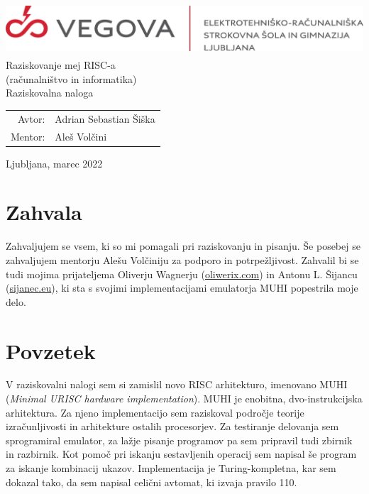 \documentclass[12pt]{article}
\begin{document}
\linespread{1.25}
\begin{titlepage}
  \begin{center}
    \includegraphics[height=2cm]{slike/vegova.png}\\
    \Huge
    \vspace*{6cm}
    Raziskovanje mej RISC-a\\
    \Large
    (računalništvo in informatika)\\
    Raziskovalna naloga\\
  \end{center}
  \vspace{8cm}
  \begin{tabular}{rl}
    Avtor: & Adrian Sebastian Šiška\\
    Mentor: & Aleš Volčini
  \end{tabular}
  \vspace{1cm}
  \begin{center}
    Ljubljana, marec 2022
  \end{center}
\end{titlepage}

\pagebreak
{}

\tableofcontents

\pagebreak

\listoffigures

\pagebreak

\section{Zahvala}
Zahvaljujem se vsem, ki so mi pomagali pri raziskovanju in pisanju.
Še posebej se zahvaljujem mentorju Alešu Volčiniju za podporo in potrpežljivost.
Zahvalil bi se tudi mojima prijateljema Oliverju Wagnerju (\url{oliwerix.com}) in Antonu L. Šijancu (\url{sijanec.eu}), ki sta s svojimi implementacijami emulatorja MUHI popestrila moje delo.

\pagebreak

\section{Povzetek}
V raziskovalni nalogi sem si zamislil novo RISC arhitekturo, imenovano MUHI (\textit{Minimal URISC hardware implementation}).
MUHI je enobitna, dvo-instrukcijska arhitektura.
Za njeno implementacijo sem raziskoval področje teorije izračunljivosti in arhitekture ostalih procesorjev.
Za testiranje delovanja sem sprogramiral emulator, za lažje pisanje programov pa sem pripravil tudi zbirnik in razbirnik.
Kot pomoč pri iskanju sestavljenih operacij sem napisal še program za iskanje kombinacij ukazov.
Implementacija je Turing-kompletna, kar sem dokazal tako, da sem napisal celični avtomat, ki izvaja pravilo 110.
\end{document}
